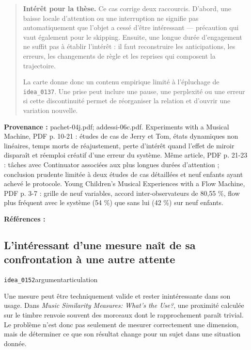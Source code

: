 \documentclass[10pt,a4paper]{article}
\begin{document}
\begin{quote}
\textbf{Intérêt pour la thèse.} Ce cas corrige deux raccourcis. D'abord, une baisse locale d'attention ou une interruption ne signifie pas automatiquement que l'objet a cessé d'être intéressant — précaution qui vaut également pour le skipping. Ensuite, une longue durée d'engagement ne suffit pas à établir l'intérêt : il faut reconstruire les anticipations, les erreurs, les changements de règle et les reprises qui composent la trajectoire.

La carte donne donc un contenu empirique limité à l'épluchage de \texttt{idea\_0137}. Une prise peut inclure une pause, une perplexité ou une erreur si cette discontinuité permet de réorganiser la relation et d'ouvrir une variation nouvelle.
\end{quote}
{\footnotesize\color{metadata}\textbf{Provenance :} pachet-04j.pdf; addessi-06c.pdf. Experiments with a Musical Machine, PDF p. 10-21 : études de cas de Jerry et Tom, états dynamiques non linéaires, temps morts de réajustement, perte d'intérêt quand l'effet de miroir disparaît et réemploi créatif d'une erreur du système. Même article, PDF p. 21-23 : tâches avec Continuator associées aux plus longues durées d'attention ; conclusion prudente limitée à deux études de cas détaillées et neuf enfants ayant achevé le protocole. Young Children's Musical Experiences with a Flow Machine, PDF p. 3-7 : grille de neuf variables, accord inter-observateurs de 80,55 \%, flow plus fréquent avec le système (54 \%) que sans lui (42 \%) sur neuf enfants.\par}
{\footnotesize\color{metadata}\textbf{Références :} \parencite{addessi2005experiments,addessi2006flowmachine}\par}

\subsection{L'intéressant d'une mesure naît de sa confrontation à une autre attente}
{\small\color{metadata} \texttt{idea\_0152}\quad\textbullet\quad argument\quad\textbullet\quad articulation\par}

Une mesure peut être techniquement valide et rester inintéressante dans son usage. Dans \emph{Music Similarity Measures: What's the Use?}, une proximité calculée sur le timbre renvoie souvent des morceaux dont le rapprochement paraît trivial. Le problème n'est donc pas seulement de mesurer correctement une dimension, mais de déterminer ce que son résultat change pour un sujet dans une situation donnée.
\end{document}
